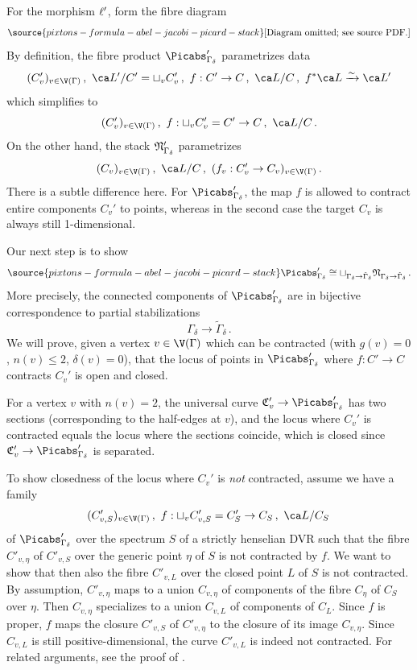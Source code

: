 

For the morphism $\ell'$, form the  fibre diagram
\begin{equation} \label{eqn:frakNdiagrampprime}
\source{pixtons-formula-abel-jacobi-picard-stack}
\text{[Diagram omitted; see source PDF.]}
\end{equation}
By definition, the fibre product $\Picabs'_{\Gamma_{\delta}}$ parametrizes data
\[(C_v')_{v \in \V(\Gamma)}\, , \,\, \ca L'/C'=\sqcup_v C_v'\, , \,\, f: C' \to C\, , \,\, \ca L/C\, , \,\, f^* \ca L \xrightarrow{\sim} \ca L'\]
which simplifies to
\[(C_v')_{v \in \V(\Gamma)}\, , \,\, f: \sqcup_v C_v' = C' \to C\, , \,\, \ca L/C\, .\]
On the other hand, the stack $\frak N_{\Gamma_\delta}'$   parametrizes
\[
(C_v)_{v\in \V(\Gamma)}\, , \,\, \ca L/C\, , \,\, (f_v:C'_v\to C_v)_{v\in \V(\Gamma)}\, .
\]
There is a subtle difference here. For $\Picabs'_{\Gamma_{\delta}}$, the map $f$ is allowed to contract entire components $C_v'$ to points, whereas in the second case the target $C_v$ is always still 1-dimensional.


Our next step is to show
\begin{equation} \label{eqn:Picabsprimeiso}
\source{pixtons-formula-abel-jacobi-picard-stack}
\Picabs'_{\Gamma_{\delta}} \cong \sqcup_{\Gamma_{\delta}\to \tilde{\Gamma}_{\delta}} \frak N_{\Gamma_{\delta}\to \tilde{\Gamma}_{\delta}}\, .\end{equation}
More precisely,
the connected components of $\Picabs'_{\Gamma_{\delta}}$ are in bijective correspondence to partial stabilizations $$\Gamma_{\delta}\to\tilde{\Gamma}_{\delta}\, .$$
We will prove, given a vertex $v \in \V(\Gamma)$ which can be contracted (with $g(v)=0$, $n(v) \leq 2$, $\delta(v)=0$), that
the locus of points in $\Picabs'_{\Gamma_{\delta}}$ where $f: C' \to C$ contracts $C_v'$ is open and closed.

For a vertex $v$ with $n(v)=2$, the universal curve $\frak C_v' \to \Picabs'_{\Gamma_{\delta}}$ has two sections (corresponding to the half-edges at $v$), and the locus where $C_v'$ is contracted equals the locus where the sections coincide, which is closed since $\frak C_v' \to \Picabs'_{\Gamma_{\delta}}$ is separated.

To show closedness of the locus where $C_v'$ is \emph{not} contracted, assume we have a family
\[(C_{v,S}')_{v \in \V(\Gamma)}\, , \,\, f: \sqcup_v C_{v,S}' = C_S' \to C_S\, , \,\, \ca L/C_S\, \]
of $\Picabs'_{\Gamma_{\delta}}$ over the spectrum $S$ of a strictly henselian DVR such that the fibre $C'_{v,\eta}$ of $C'_{v,S}$ over the generic point $\eta$ of $S$ is not contracted by $f$. We want to show that then also the fibre $C'_{v,L}$ over the closed point $L$ of $S$ is not contracted. By assumption,  $C'_{v,\eta}$ maps to a union $C_{v,\eta}$ of components of the fibre $C_\eta$ of $C_S$ over $\eta$. Then $C_{v,\eta}$ specializes to a union $C_{v,L}$ of components of $C_L$. Since $f$ is proper, $f$ maps the closure $C'_{v,S}$ of $C'_{v,\eta}$ to the closure of its image $C_{v,\eta}$. Since $C_{v,L}$ is still positive-dimensional, the curve $C'_{v,L}$ is indeed not contracted. For related arguments, see the proof of \cite[Proposition 2.2]{Kresch2013Flattening-stra}.

